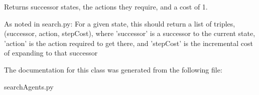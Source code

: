 \begin{DoxyVerb}Returns successor states, the actions they require, and a cost of 1.

 As noted in search.py:
     For a given state, this should return a list of triples,
 (successor, action, stepCost), where 'successor' is a
 successor to the current state, 'action' is the action
 required to get there, and 'stepCost' is the incremental
 cost of expanding to that successor
\end{DoxyVerb}
 

The documentation for this class was generated from the following file\+:\begin{DoxyCompactItemize}
\item 
search\+Agents.\+py\end{DoxyCompactItemize}
